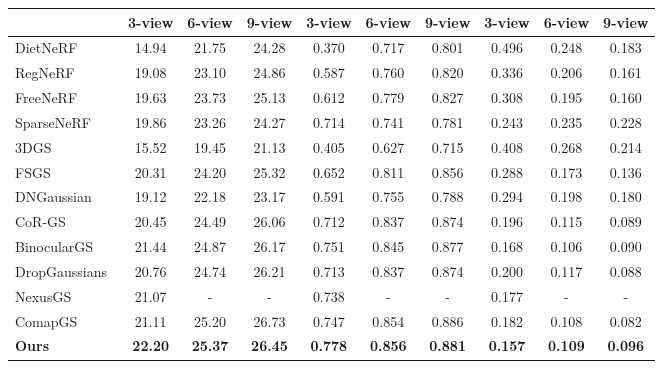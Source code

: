 \begin{table}[t]
{\begin{tabular}{l|ccc|ccc|ccc}
  \cmidrule{2-10}
  & 3-view & 6-view & 9-view & 3-view & 6-view & 9-view & 3-view & 6-view & 9-view \\
  \midrule
  DietNeRF~\cite{jain2021dietnerf} & 14.94 & 21.75 & 24.28 & 0.370 & 0.717 & 0.801 & 0.496 & 0.248 & 0.183 \\
  RegNeRF~\cite{niemeyer2022regnerf} & 19.08 & 23.10 & 24.86 & 0.587 & 0.760 & 0.820 & 0.336 & 0.206 & 0.161\\
  FreeNeRF~\cite{yang2023freenerf} & 19.63 & 23.73 & 25.13 & 0.612 & 0.779 & 0.827 & 0.308 & 0.195 & 0.160 \\
  SparseNeRF~\cite{wang2023sparsenerf} & 19.86 & 23.26 & 24.27 & 0.714 & 0.741 & 0.781 & 0.243 & 0.235 & 0.228 \\
  \midrule
  3DGS~\cite{kerbl20233d} & 15.52 & 19.45 & 21.13 & 0.405 & 0.627 & 0.715 & 0.408 & 0.268 & 0.214 \\
  FSGS~\cite{zhu2024fsgs} & 20.31 & 24.20 & 25.32 & 0.652 & 0.811 & 0.856 & 0.288 & 0.173 & 0.136 \\
  DNGaussian~\cite{li2024dngaussian} & 19.12 & 22.18 & 23.17 & 0.591 & 0.755 & 0.788 & 0.294 & 0.198 & 0.180\\
  CoR-GS~\cite{zhang2024cor} & 20.45 & 24.49 & 26.06 & 0.712 & 0.837 & 0.874 & 0.196 & 0.115 & \colorbox{thirdplace}{0.089} \\
  BinocularGS~\cite{han2024binocular} & \colorbox{secondplace}{21.44} & \colorbox{thirdplace}{24.87} & 26.17 & \colorbox{secondplace}{0.751} & \colorbox{thirdplace}{0.845} & \colorbox{thirdplace}{0.877} & \colorbox{secondplace}{0.168} & \colorbox{firstplace}{0.106} & 0.090 \\
  DropGaussians~\cite{park2025dropgaussian} & 20.76 & 24.74 & \colorbox{thirdplace}{26.21} & 0.713 & 0.837 & 0.874 & 0.200 & 0.117 & \colorbox{secondplace}{0.088} \\
  NexusGS~\cite{zheng2025nexusgs} & 21.07 & - & - & 0.738 & - & - & \colorbox{thirdplace}{0.177} & - & - \\
  ComapGS~\cite{jang2025comapgs} & \colorbox{thirdplace}{21.11} & \colorbox{secondplace}{25.20} & \colorbox{firstplace}{26.73} & \colorbox{thirdplace}{0.747} & \colorbox{secondplace}{0.854} & \colorbox{firstplace}{0.886} & 0.182 & \colorbox{secondplace}{0.108} & \colorbox{firstplace}{0.082} \\
  \midrule
  \textbf{Ours} & \colorbox{firstplace}{\textbf{22.20}} & \colorbox{firstplace}{\textbf{25.37}} & \colorbox{secondplace}{\textbf{26.45}} & \colorbox{firstplace}{\textbf{0.778}} & \colorbox{firstplace}{\textbf{0.856}} & \colorbox{secondplace}{\textbf{0.881}} & \colorbox{firstplace}{\textbf{0.157}} & \colorbox{thirdplace}{\textbf{0.109}} & {\textbf{0.096}} \\
  \bottomrule
  \end{tabular}
  }
  \end{table}


